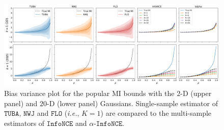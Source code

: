 \documentclass{article}
\theoremstyle{plain}
\theoremstyle{definition}
\theoremstyle{remark}
\newcommand{\infonce}{\texttt{InfoNCE}}
\newcommand{\TUBA}{\texttt{TUBA}}
\newcommand{\NWJ}{\texttt{NWJ}}
\newcommand{\FLO}{\texttt{FLO}}
\begin{document}
		
		
		\begin{figure}[t!]
			\begin{center}
				\includegraphics[width=1.\textwidth]{figures/toy/1D-10D-all.pdf}
			\end{center}
			\vspace{-1.5em}
			\caption{Bias variance plot for the popular MI bounds with the $2$-D (upper panel) and $20$-D (lower panel) Gaussians. Single-sample estimator of $\TUBA$, $\NWJ$ and $\FLO$ ({\it i.e.}, $K=1$) are compared to the multi-sample estimators of $\infonce$ and $\alpha$-$\infonce$. \label{fig:cmp_var_single}}
			\vspace{-1.em}
		\end{figure}
		
		
		
		
\end{document}
